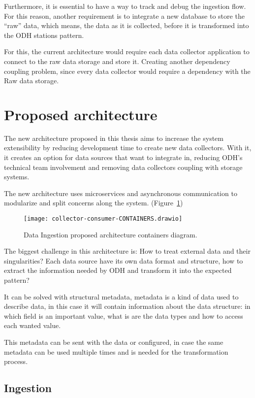 Furthermore, it is essential to have a way to track and debug the ingestion flow. For this reason, another requirement is to integrate a new database to store the “raw” data, which means, the data as it is collected, before it is transformed into the ODH stations pattern.

For this, the current architecture would require each data collector application to connect to the raw data storage and store it. Creating another dependency coupling problem, since every data collector would require a dependency with the Raw data storage.

\section{Proposed architecture}
\label{sec:proposed}

The new architecture proposed in this thesis aims to increase the system extensibility by reducing development time to create new data collectors. With it, it creates an option for data sources that want to integrate in, reducing ODH's technical team involvement and removing data collectors coupling with storage systems.

The new architecture uses microservices and asynchronous communication to modularize and split concerns along the system. (Figure~\ref{fig:containers})

\begin{figure}
    \centering
    \texttt{[image: collector-consumer-CONTAINERS.drawio]}
    \caption{Data Ingestion proposed architecture containers diagram.\label{fig:containers}}
\end{figure}

The biggest challenge in this architecture is: How to treat external data and their singularities? Each data source have its own data format and structure, how to extract the information needed by ODH and transform it into the expected pattern?

It can be solved with structural metadata, metadata is a kind of data used to describe data, in this case it will contain information about the data structure: in which field is an important value, what is are the data types and how to access each wanted value.

This metadata can be sent with the data or configured, in case the same metadata can be used multiple times and is needed for the transformation process.

\subsection{Ingestion}
\label{sec:ingestion}

